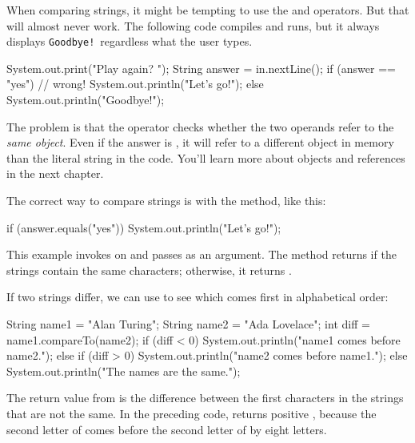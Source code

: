 
When comparing strings, it might be tempting to use the \java{==} and \java{!=} operators.
But that will almost never work.
The following code compiles and runs, but it always displays {\tt Goodbye!}\ regardless what the user types.

\begin{code}
System.out.print("Play again? ");
String answer = in.nextLine();
if (answer == "yes") {                 // wrong!
    System.out.println("Let's go!");
} else {
    System.out.println("Goodbye!");
}
\end{code}

The problem is that the \java{==} operator checks whether the two operands refer to the {\em same object}.
Even if the answer is , it will refer to a different object in memory than the literal string  in the code.
You'll learn more about objects and references in the next chapter.

The correct way to compare strings is with the  method, like this:

\begin{code}
if (answer.equals("yes")) {
    System.out.println("Let's go!");
}
\end{code}

This example invokes  on  and passes  as an argument.
The  method returns  if the strings contain the same characters; otherwise, it returns .


If two strings differ, we can use  to see which comes first in alphabetical order:

\begin{code}
String name1 = "Alan Turing";
String name2 = "Ada Lovelace";
int diff = name1.compareTo(name2);
if (diff < 0) {
    System.out.println("name1 comes before name2.");
} else if (diff > 0) {
    System.out.println("name2 comes before name1.");
} else {
    System.out.println("The names are the same.");
}
\end{code}

The return value from  is the difference between the first characters in the strings that are not the same.
In the preceding code,  returns positive , because the second letter of  comes before the second letter of  by eight letters.

